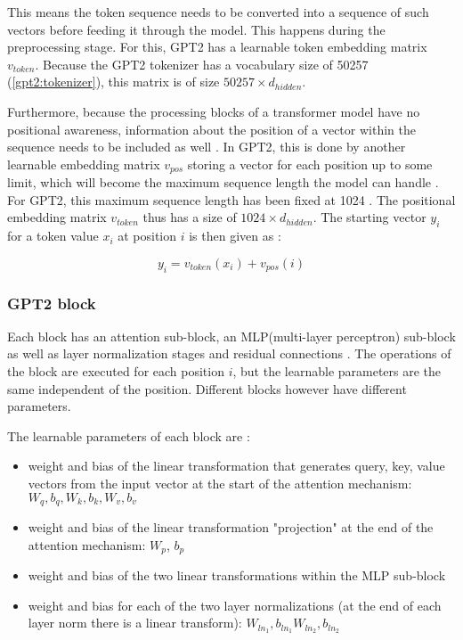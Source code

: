 This means the token sequence needs to be converted into a sequence of such vectors before feeding it through the model. This happens during the preprocessing stage.
For this, GPT2 has a learnable token embedding matrix $v_{token}$.  Because the GPT2 tokenizer has a vocabulary size of 50257 (\ref{gpt2:tokenizer}), this matrix is of size $50257 \times d_{hidden}$.

\begin{samepage}

Furthermore, because the processing blocks of a transformer model have no positional awareness, information about the position of a vector within the sequence needs to be included as well .
In GPT2, this is done by another learnable embedding matrix $v_{pos}$ storing a vector for each position up to some limit, which will become the maximum sequence length the model can handle   . For GPT2, this maximum sequence length has been fixed at 1024  \cite{HuggingFaceGPT2}.
The positional embedding matrix $v_{token}$ thus has a size of $1024 \times d_{hidden}$.
The starting vector $y_i$ for a token value $x_i$ at position $i$ is then given as :

$$y_i = v_{token}(x_i) + v_{pos}(i)$$

\end{samepage}


\subsubsection{GPT2 block}


Each block has an attention sub-block, an MLP(multi-layer perceptron) sub-block as well as layer normalization stages and residual connections  .
The operations of the block are executed for each position $i$, but the learnable parameters are the same independent of the position. Different blocks however have different parameters.

The learnable parameters of each block are \cite{alammar-gpt2}:

\begin{itemize}
\item weight and bias of the linear transformation that generates query, key, value vectors from the input vector
   at the start of the attention mechanism: $W_q, b_q, W_k, b_k, W_v, b_v$
 \item weight and bias of the linear transformation "projection" at the end of the attention mechanism: $W_p$, $b_p$
 \item weight and bias of the two linear transformations within the MLP sub-block
 \item weight and bias for each of the two layer normalizations (at the end of each layer norm there is a linear transform): $W_{ln_1}, b_{ln_1} W_{ln_2}, b_{ln_2}$
\end{itemize}

